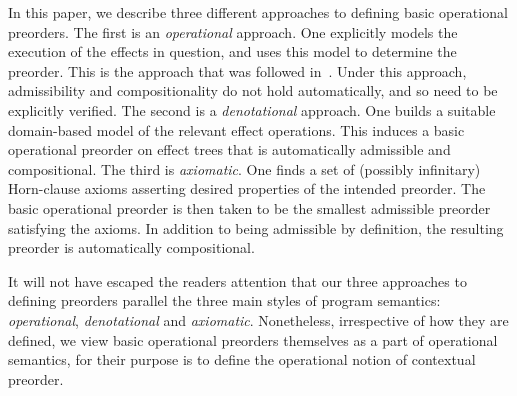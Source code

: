 \documentclass[a4paper,UKenglish]{lipics-v2018}
\theoremstyle{plain}
\begin{document}
In this paper, we describe three different approaches to defining basic operational preorders. 
The first is an \emph{operational} approach. One explicitly models the execution of the effects in question, and uses this model to determine the preorder. This is the approach that was followed 
in~\cite{gom}. Under this approach, admissibility and compositionality do not hold automatically, and so need to be explicitly verified. The second is a  \emph{denotational} approach. One builds a suitable domain-based model of the relevant effect operations. This induces a basic operational preorder on  effect trees that is automatically admissible and compositional. 
The third is \emph{axiomatic}. One finds a set of (possibly infinitary) Horn-clause axioms asserting desired properties of the intended preorder. The basic operational preorder is then taken to be the smallest admissible preorder satisfying the axioms. In addition to being admissible by definition, the resulting preorder is automatically compositional. 

It will not have escaped the readers attention that our three approaches to defining preorders  parallel the three main styles of program semantics: \emph{operational}, \emph{denotational} and \emph{axiomatic}. Nonetheless, irrespective of how they are defined, we view basic operational preorders themselves as a part of operational semantics, for their purpose is to define the operational notion of contextual preorder. 
\end{document}
